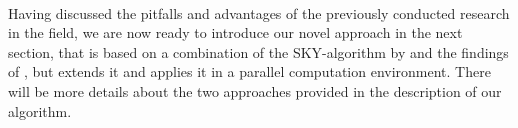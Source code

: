 \\
Having discussed the pitfalls and advantages of the previously conducted research in the field, we are now ready to introduce our novel approach in the next section, that is based on a combination of the SKY-algorithm by  and the findings of , but extends it and applies it in a parallel computation environment. There will be more details about the two approaches provided in the description of our algorithm.